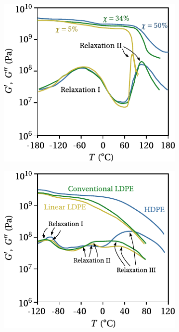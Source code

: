 \begin{figure}[htbp]
\centering
\begin{subfigure}[b]{0.45\textwidth}
\centering
\includegraphics[width=\textwidth]{figures/pet_dma}
\caption{}
\label{subfig:pet_dma}
\end{subfigure} \hfill
    \begin{subfigure}[b]{0.45\textwidth}
        \centering
                        \includegraphics[width=\textwidth]{figures/pe_dma}

\end{subfigure}
\end{figure}

